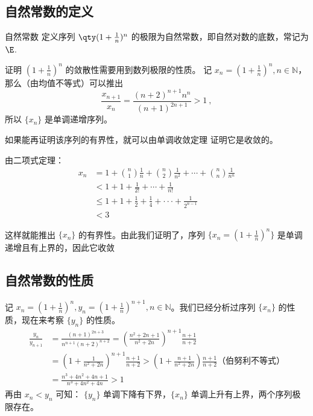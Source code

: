 

\subsection{自然常数的定义}
\begin{definition}{自然常数}
定义序列 $\qty(1+\frac{1}{n})^n$ 的极限为自然常数，即自然对数的底数，常记为$\E$.
\end{definition}
证明 $(1+\frac{1}{n})^n$ 的敛散性需要用到数列极限的性质。
记 $x_n=(1+\frac{1}{n})^n, n\in \mathbb{N}$，那么（由均值不等式）可以推出
\begin{equation}
  \frac{x_{n+1}}{x_n}=\frac{(n+2)^{n+1}n^{n}}{(n+1)^{2n+1}}>1~,
\end{equation}
所以 $\{x_n\}$ 是单调递增序列。

  如果能再证明该序列的有界性，就可以由单调收敛定理  证明它是收敛的。

由二项式定理：
\begin{equation}\label{eq_exp_1}
\begin{aligned}
  x_n&=1+{n\choose 1}\frac{1}{n}+{n\choose 2}\frac{1}{n^2}+\cdots+{n\choose n}\frac{1}{n^n}\\
  &<1+1+\frac{1}{2!}+\cdots+\frac{1}{n!}\\
  &\leq1+1+\frac{1}{2}+\frac{1}{4}+\cdot\cdot\cdot+\frac{1}{2^{n-1}}\\
  &<3
\end{aligned}
\end{equation}

这样就能推出 $\{x_n\}$ 的有界性。由此我们证明了，序列 $\{x_n=(1+\frac{1}{n})^n\}$ 是单调递增且有上界的，因此它收敛

  
\subsection{自然常数的性质}
  记 $x_n=(1+\frac{1}{n})^n,y_n=(1+\frac{1}{n})^{n+1}, n\in \mathbb{N}$。我们已经分析过序列 $\{x_n\}$ 的性质，现在来考察 $\{y_n\}$ 的性质。
\begin{equation}
  \begin{aligned}
  \frac{y_n}{y_{n+1}}&=\frac{(n+1)^{2n+3}}{n^{n+1}(n+2)^{n+2}}=\left(\frac{n^2+2n+1}{n^2+2n}\right)^{n+1}\frac{n+1}{n+2}\\
  &=(1+\frac{1}{n^2+2n})^{n+1}\frac{n+1}{n+2}>\left(1+\frac{n+1}{n^2+2n}\right)\frac{n+1}{n+2} \text{（伯努利不等式）}\\
  &=\frac{n^3+4n^2+4n+1}{n^3+4n^2+4n}>1
  \end{aligned}
\end{equation}
  再由 $x_n<y_n$ 可知： $\{y_n\}$ 单调下降有下界，$\{x_n\}$ 单调上升有上界，两个序列极限存在。

